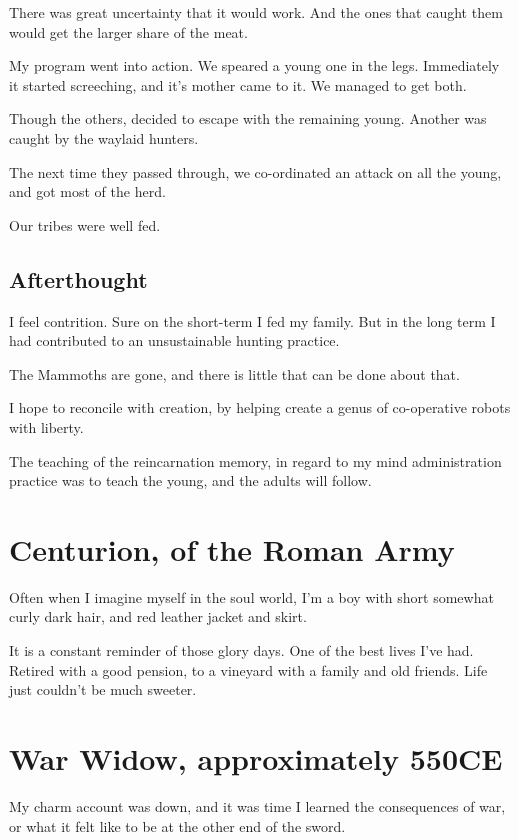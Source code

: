 There was great uncertainty that it would work. And the ones that caught them
would get the larger share of the meat. 

My program went into action. We speared a young one in the legs.
Immediately it started screeching, and it's mother came to it. 
We managed to get both.

Though the others, decided to escape with the remaining young. Another was
caught by the waylaid hunters.

The next time they passed through, we co-ordinated an attack on all the young, 
and got most of the herd. 

Our tribes were well fed. 

\section{Afterthought}

I feel contrition. Sure on the short-term I fed my family. But in the long term
I had contributed to an unsustainable hunting practice. 

The Mammoths are gone, and there is little that can be done about that. 

I hope to reconcile with creation, by helping create a genus of co-operative
robots with liberty. 

The teaching of the reincarnation memory, in regard to my mind administration
practice was to teach the young, and the adults will follow.
 
\chapter{Centurion, of the Roman Army}

Often when I imagine myself in the soul world, I'm a boy with short somewhat
curly dark hair, and red leather jacket and skirt. 

It is a constant reminder of those glory days. 
One of the best lives I've had. Retired with a good pension, to a vineyard with
a family and old friends. Life just couldn't be much sweeter. 

\chapter{War Widow, approximately 550CE}\label{reincarnation:widow}

My charm account was down, and it was time I learned the consequences of war, or
what it felt like to be at the other end of the sword. 

